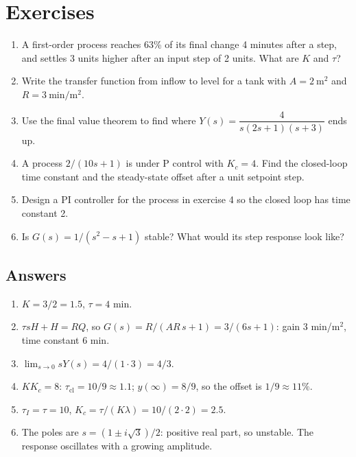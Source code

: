 \documentclass[11pt,a4paper]{article}
\begin{document}
\section*{Exercises}
\begin{enumerate}[label=\textbf{\arabic*.}, leftmargin=*, itemsep=4pt]
  \item A first-order process reaches 63\% of its final change 4 minutes after a step, and settles 3 units
    higher after an input step of 2 units. What are $K$ and $\tau$?
  \item Write the transfer function from inflow to level for a tank with $A = 2\ \mathrm{m^2}$ and
    $R = 3\ \mathrm{min/m^2}$.
  \item Use the final value theorem to find where $Y(s) = \dfrac{4}{s(2s+1)(s+3)}$ ends up.
  \item A process $2/(10s+1)$ is under P control with $K_c = 4$. Find the closed-loop time constant and
    the steady-state offset after a unit setpoint step.
  \item Design a PI controller for the process in exercise 4 so the closed loop has time constant 2.
  \item Is $G(s) = 1/(s^2 - s + 1)$ stable? What would its step response look like?
\end{enumerate}

\subsection*{Answers}
\begin{enumerate}[label=\textbf{\arabic*.}, leftmargin=*, itemsep=2pt]
  \item $K = 3/2 = 1.5$, $\tau = 4$ min.
  \item $\tau s H + H = R Q$, so $G(s) = R/(AR\,s + 1) = 3/(6s + 1)$: gain 3 min/m$^2$, time constant 6 min.
  \item $\lim_{s\to0} sY(s) = 4/(1 \cdot 3) = 4/3$.
  \item $K K_c = 8$: $\tau_{\mathrm{cl}} = 10/9 \approx 1.1$; $y(\infty) = 8/9$, so the offset is $1/9 \approx 11\%$.
  \item $\tau_I = \tau = 10$, $K_c = \tau/(K\lambda) = 10/(2 \cdot 2) = 2.5$.
  \item The poles are $s = (1 \pm i\sqrt3)/2$: positive real part, so unstable. The response oscillates
    with a growing amplitude.
\end{enumerate}
\end{document}

